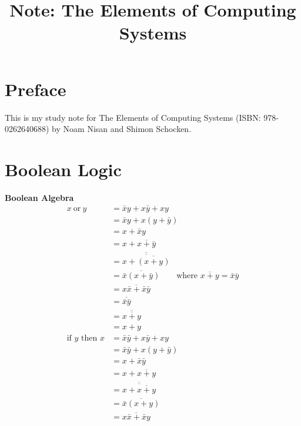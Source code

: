 \documentclass[a4paper]{book}
\title{Note: The Elements of Computing Systems}
\begin{document}
\maketitle

\chapter*{Preface}
This is my study note for The Elements of Computing Systems (ISBN:  978-0262640688) by Noam Nisan and Shimon Schocken.

\chapter{Boolean Logic}
\textbf{Boolean Algebra}
\begin{align*}
    x ~\mathrm{or}~ y & = \bar{x}y + x\bar{y} + xy \\
    &                   = \bar{x}y + x(y + \bar{y}) \\
    &                   = x + \bar{x}y \\
    &                   = x + \overline{ x + \bar{y} } \\
    &                   = \overline{ \overline{ x + \overline{(x + y) } } } \\
    &                   = \overline{\bar{x} (x + \bar{y} ) } \text{~ ~ ~ where } \overline{x + y} = \bar{x} \bar{y} \\
    &                   = \overline{ x\bar{x} + \bar{x}\bar{y} } \\
    &                   = \overline{ \bar{x} \bar{y} } \\
    &                   = \overline{\overline{x + y}} \\
    &                   = x + y \\
%
%
    \text{if } y \text{ then } x & = \bar{x}\bar{y} + x \bar{y} + xy \\
    &                              = \bar{x}\bar{y} + x(y + \bar{y}) \\
    &                              = x + \bar{x}\bar{y} \\
    &                              = x + \overline{x + y} \\
    &                              = \overline{ \overline{ x + \overline{x + y} } } \\
    &                              = \overline{ \bar{x}(x + y) } \\
    &                              = \overline{ x\bar{x} + \bar{x}y } \\

\end{align*}
\end{document}
